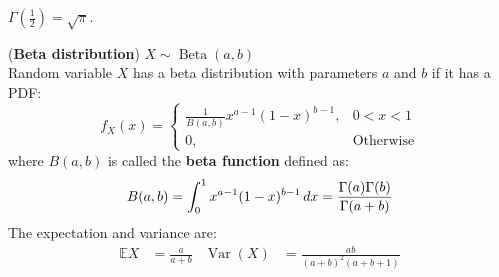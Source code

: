 \documentclass{huhtakm-template-book}
\newcommand{\expect}{\mathbb{E}}
\DeclareMathOperator{\Beta}{Beta}
\DeclareMathOperator{\Var}{Var}
\begin{document}
\begin{rem}
	$\Gamma(\frac{1}{2})=\sqrt{\pi}$.
\end{rem}
\begin{eg}(\textbf{Beta distribution}) $X\sim\Beta(a,b)$\\
	Random variable $X$ has a beta distribution with parameters $a$ and $b$ if it has a PDF:
	\begin{equation*}
		f_{X}(x)=\begin{cases}
			\frac{1}{B(a,b)}x^{a-1}(1-x)^{b-1}, &0<x<1\\
			0, &\text{Otherwise}
		\end{cases}
	\end{equation*}
	where $B(a,b)$ is called the \textbf{beta function} defined as:
	\begin{equation*}
		B(a,b)=\int_{0}^{1}x^{a-1}(1-x)^{b-1}\,dx=\frac{\Gamma(a)\Gamma(b)}{\Gamma(a+b)}
	\end{equation*}
	The expectation and variance are:
	\begin{align*}
		\expect{X}&=\frac{a}{a+b} & \Var(X)&=\frac{ab}{(a+b)^{2}(a+b+1)}
	\end{align*}
\end{eg}

\newpage
\end{document}
